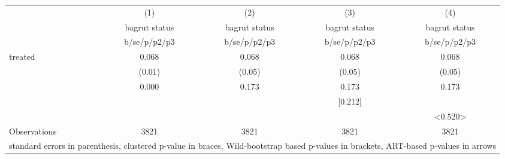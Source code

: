 {
\def\sym#1{\ifmmode^{#1}\else\(^{#1}\)\fi}
\begin{tabular}{l*{4}{c}}
\hline\hline
                    &\multicolumn{1}{c}{(1)}&\multicolumn{1}{c}{(2)}&\multicolumn{1}{c}{(3)}&\multicolumn{1}{c}{(4)}\\
                    &\multicolumn{1}{c}{bagrut status}&\multicolumn{1}{c}{bagrut status}&\multicolumn{1}{c}{bagrut status}&\multicolumn{1}{c}{bagrut status}\\
                    &b/se/p/p2/p3         &b/se/p/p2/p3         &b/se/p/p2/p3         &b/se/p/p2/p3         \\
\hline
treated             &       0.068         &       0.068         &       0.068         &       0.068         \\
                    &      (0.01)         &      (0.05)         &      (0.05)         &      (0.05)         \\
                    &     {0.000}         &     {0.173}         &     {0.173}         &     {0.173}         \\
                    &                     &                     &     [0.212]         &                     \\
                    &                     &                     &                     &     <0.520>         \\
\hline
Observations        &        3821         &        3821         &        3821         &        3821         \\
\hline\hline
\multicolumn{5}{l}{\footnotesize standard errors in parenthesis, clustered p-value in braces, Wild-bootstrap based p-values in brackets, ART-based p-values in arrows}\\
\end{tabular}
}
